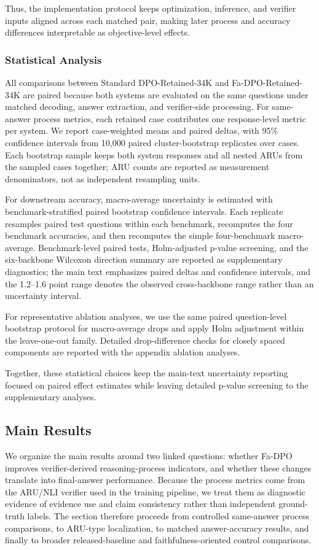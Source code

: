 \documentclass[a4paper,fleqn,doubleblind]{cas-sc}
\begin{document}
Thus, the implementation protocol keeps optimization, inference, and verifier inputs aligned across each matched pair, making later process and accuracy differences interpretable as objective-level effects.

\subsubsection{Statistical Analysis}
All comparisons between Standard DPO-Retained-34K and Fa-DPO-Retained-34K are paired because both systems are evaluated on the same questions under matched decoding, answer extraction, and verifier-side processing. For same-answer process metrics, each retained case contributes one response-level metric per system. We report case-weighted means and paired deltas, with 95\% confidence intervals from 10,000 paired cluster-bootstrap replicates over cases. Each bootstrap sample keeps both system responses and all nested ARUs from the sampled cases together; ARU counts are reported as measurement denominators, not as independent resampling units.

For downstream accuracy, macro-average uncertainty is estimated with benchmark-stratified paired bootstrap confidence intervals. Each replicate resamples paired test questions within each benchmark, recomputes the four benchmark accuracies, and then recomputes the simple four-benchmark macro-average. Benchmark-level paired tests, Holm-adjusted p-value screening, and the six-backbone Wilcoxon direction summary are reported as supplementary diagnostics; the main text emphasizes paired deltas and confidence intervals, and the 1.2--1.6 point range denotes the observed cross-backbone range rather than an uncertainty interval.

For representative ablation analyses, we use the same paired question-level bootstrap protocol for macro-average drops and apply Holm adjustment within the leave-one-out family. Detailed drop-difference checks for closely spaced components are reported with the appendix ablation analyses.

Together, these statistical choices keep the main-text uncertainty reporting focused on paired effect estimates while leaving detailed p-value screening to the supplementary analyses.

\subsection{Main Results}
\label{subsec:main_results}
We organize the main results around two linked questions: whether Fa-DPO improves verifier-derived reasoning-process indicators, and whether these changes translate into final-answer performance. Because the process metrics come from the ARU/NLI verifier used in the training pipeline, we treat them as diagnostic evidence of evidence use and claim consistency rather than independent ground-truth labels. The section therefore proceeds from controlled same-answer process comparisons, to ARU-type localization, to matched answer-accuracy results, and finally to broader released-baseline and faithfulness-oriented control comparisons.
\end{document}
